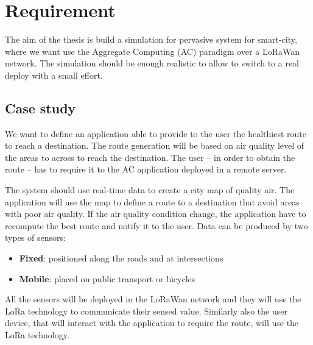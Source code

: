 \chapter{Requirement}

The aim of the thesis is build a simulation for pervasive system for smart-city, where we want use the Aggregate Computing (AC) paradigm over a LoRaWan network. The simulation should be enough realistic to allow to switch to a real deploy with a small effort.

\section{Case study}

We want to define an application able to provide to the user the healthiest route to reach a destination. The route generation will be based on air quality level of the areas to across to reach the destination. The user -- in order to obtain the route -- has to require it to the AC application deployed in a remote server.

The system should use real-time data to create a city map of quality air.
The application will use the map to define a route to a destination that avoid areas with poor air quality.
If the air quality condition change, the application have to recompute the best route and notify it to the user. 
Data can be produced by two types of sensors:
\begin{itemize}
    \item \textbf{Fixed}: positioned along the roads and at intersections
    \item \textbf{Mobile}: placed on public transport or bicycles
\end{itemize}

All the sensors will be deployed in the LoRaWan network and they will use the LoRa technology to communicate their sensed value. Similarly also the user device, that will interact with the application to require the route, will use the LoRa technology.
